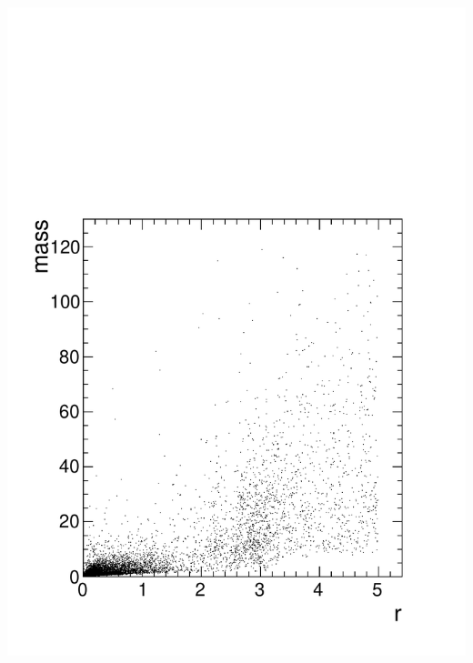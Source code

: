 \documentclass[compress]{beamer}
\begin{document}
\begin{frame}
\begin{columns}
\includegraphics[width=\linewidth]{mass_vs_r_background.pdf}
\end{columns}
\end{frame}
\end{document}
